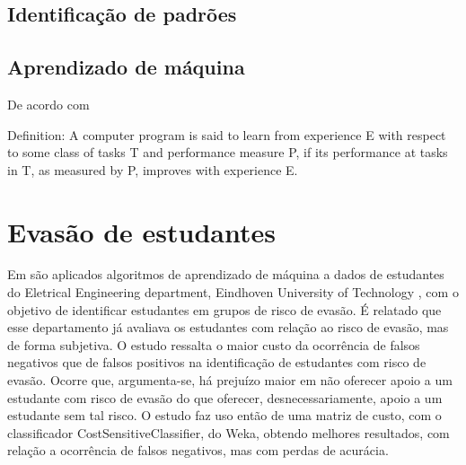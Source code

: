 \documentclass[a4paper]{article}
\begin{document}
\subsection{Identificação de padrões}
\subsection{Aprendizado de máquina}
De acordo com \cite{Tom_mitchell} 

Definition: A computer program is said to learn from experience E with respect to some class of tasks T and performance measure P, if its performance at tasks in T, as measured by P, improves with experience E. 

\cite{ML_debt} \cite{ML_know}


\section{Evasão de estudantes}
Em \cite{EDM_pred_dropout} são aplicados algoritmos de aprendizado de máquina a dados de estudantes do Eletrical Engineering department, Eindhoven University of Technology , com o objetivo de identificar estudantes em grupos de risco de evasão. É relatado que esse departamento já avaliava os estudantes com relação ao risco de evasão, mas de forma subjetiva. O estudo ressalta o maior custo da ocorrência de falsos negativos que de falsos positivos na identificação de estudantes com risco de evasão. Ocorre que, argumenta-se, há prejuízo maior em não oferecer apoio a um estudante com risco de evasão do que oferecer, desnecessariamente, apoio a um estudante sem tal risco. O estudo faz uso então de uma matriz de custo, com o classificador CostSensitiveClassifier, do Weka, obtendo melhores resultados, com relação a ocorrência de falsos negativos, mas com perdas de acurácia. 

\cite{EDM_review_and_soa} 
\cite{EDM_retention} 
\cite{EDM_education}
\cite{EDM_dropout_rates}
\cite{EDM_ufrj}
\cite{EDM_ufrj2}
\cite{EDM_brasil}


\end{document}
